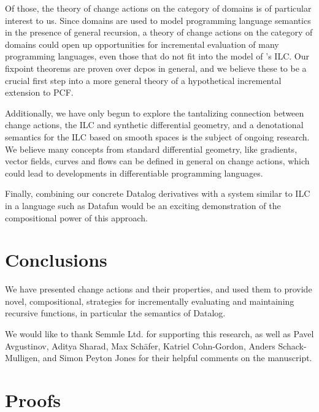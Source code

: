 Of those, the theory of change actions on the category of domains is of
particular interest to us. Since domains are used to model programming language
semantics in the presence of general recursion, a theory of change actions on
the category of domains could open up opportunities for incremental evaluation
of many programming languages, even those that do not fit into the model of
\citeauthor{cai2014changes}'s ILC. Our fixpoint theorems are proven over dcpos
in general, and we believe these to be a crucial first step into a more general
theory of a hypothetical incremental extension to PCF.

Additionally, we have only begun to explore the tantalizing connection between
change actions, the ILC and synthetic differential geometry, and a denotational
semantics for the ILC based on smooth spaces is the subject of ongoing research.
We believe many concepts from standard differential geometry, like gradients,
vector fields, curves and flows can be defined in general on change actions, which
could lead to developments in differentiable programming languages.

Finally, combining our concrete Datalog derivatives with a system similar to ILC
in a language such as Datafun would be an exciting demonstration of the compositional
power of this approach.

\section{Conclusions}

We have presented change actions and their properties, and used them to provide
novel, compositional, strategies for incrementally evaluating and maintaining recursive functions, in
particular the semantics of Datalog.


\begin{acks}

We would like to thank Semmle Ltd. for supporting this research, as well as Pavel
Avgustinov, Aditya Sharad, Max Sch\"afer, Katriel Cohn-Gordon, Anders
Schack-Mulligen, and Simon Peyton Jones for their
helpful comments on the manuscript.

\end{acks}

\printbibliography

\clearpage
\appendix
\appendixpage
\section{Proofs}

